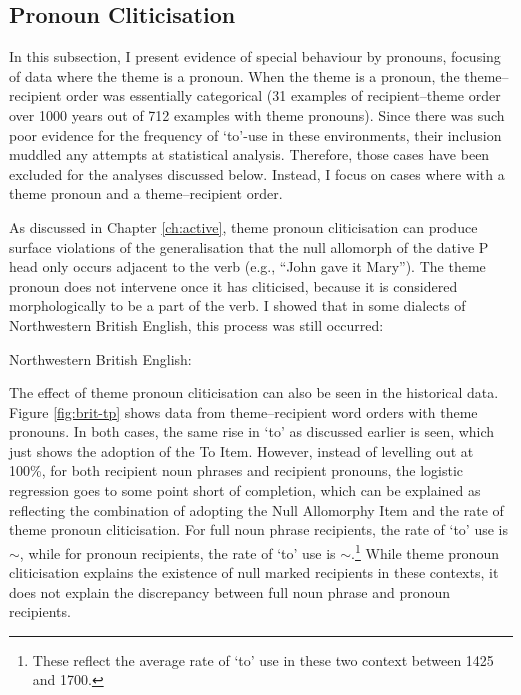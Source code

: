 	\subsection{Pronoun Cliticisation}\label{sec:act-tp}
	In this subsection, I present evidence of special behaviour by pronouns, focusing of data where the theme is a pronoun. When the theme is a pronoun, the theme--recipient order was essentially categorical (31 examples of recipient--theme order over 1000 years out of 712 examples with theme pronouns). Since there was such poor evidence for the frequency of `to'-use in these environments, their inclusion muddled any attempts at statistical analysis. Therefore, those cases have been excluded for the analyses discussed below. Instead, I focus on cases where with a theme pronoun and a theme--recipient order.

	As discussed in Chapter \ref{ch:active}, theme pronoun cliticisation can produce surface violations of the generalisation that the null allomorph of the dative P head only occurs adjacent to the verb (e.g., ``John gave it Mary''). The theme pronoun does not intervene once it has cliticised, because it is considered morphologically to be a part of the verb. I showed that in some dialects of Northwestern British English, this process was still occurred:

	\begin{exe}
		 Northwestern British English:
		\begin{xlist}
	\end{xlist}
	\end{exe}

	The effect of theme pronoun cliticisation can also be seen in the historical data. Figure \ref{fig:brit-tp} shows data from theme--recipient word orders with theme pronouns. In both cases, the same rise in `to' as discussed earlier is seen, which just shows the adoption of the To Item. However, instead of levelling out at 100\%, for both recipient noun phrases and recipient pronouns, the logistic regression goes to some point short of completion, which can be explained as reflecting the combination of adopting the Null Allomorphy Item and the rate of theme pronoun cliticisation. For full noun phrase recipients, the rate of `to' use is $\sim$, while for pronoun recipients, the rate of `to' use is $\sim$.\footnote{These reflect the average rate of `to' use in these two context between 1425 and 1700.} While theme pronoun cliticisation explains the existence of null marked recipients in these contexts, it does not explain the discrepancy between full noun phrase and pronoun recipients.

